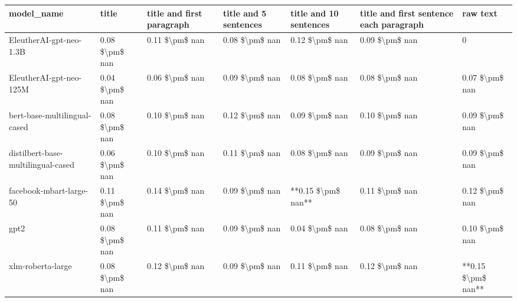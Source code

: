 \begin{tabular}{lllllll}
\toprule
                        model\_name &          title & title and first paragraph & title and 5 sentences & title and 10 sentences & title and first sentence each paragraph &           raw text \\
\midrule
           EleutherAI-gpt-neo-1.3B & 0.08 \$\textbackslash pm\$ nan &            0.11 \$\textbackslash pm\$ nan &        0.08 \$\textbackslash pm\$ nan &         0.12 \$\textbackslash pm\$ nan &                          0.09 \$\textbackslash pm\$ nan &                  0 \\
           EleutherAI-gpt-neo-125M & 0.04 \$\textbackslash pm\$ nan &            0.06 \$\textbackslash pm\$ nan &        0.09 \$\textbackslash pm\$ nan &         0.08 \$\textbackslash pm\$ nan &                          0.08 \$\textbackslash pm\$ nan &     0.07 \$\textbackslash pm\$ nan \\
      bert-base-multilingual-cased & 0.08 \$\textbackslash pm\$ nan &            0.10 \$\textbackslash pm\$ nan &        0.12 \$\textbackslash pm\$ nan &         0.09 \$\textbackslash pm\$ nan &                          0.10 \$\textbackslash pm\$ nan &     0.09 \$\textbackslash pm\$ nan \\
distilbert-base-multilingual-cased & 0.06 \$\textbackslash pm\$ nan &            0.10 \$\textbackslash pm\$ nan &        0.11 \$\textbackslash pm\$ nan &         0.08 \$\textbackslash pm\$ nan &                          0.09 \$\textbackslash pm\$ nan &     0.09 \$\textbackslash pm\$ nan \\
           facebook-mbart-large-50 & 0.11 \$\textbackslash pm\$ nan &            0.14 \$\textbackslash pm\$ nan &        0.09 \$\textbackslash pm\$ nan &     **0.15 \$\textbackslash pm\$ nan** &                          0.11 \$\textbackslash pm\$ nan &     0.12 \$\textbackslash pm\$ nan \\
                              gpt2 & 0.08 \$\textbackslash pm\$ nan &            0.11 \$\textbackslash pm\$ nan &        0.09 \$\textbackslash pm\$ nan &         0.04 \$\textbackslash pm\$ nan &                          0.08 \$\textbackslash pm\$ nan &     0.10 \$\textbackslash pm\$ nan \\
                 xlm-roberta-large & 0.08 \$\textbackslash pm\$ nan &            0.12 \$\textbackslash pm\$ nan &        0.09 \$\textbackslash pm\$ nan &         0.11 \$\textbackslash pm\$ nan &                          0.12 \$\textbackslash pm\$ nan & **0.15 \$\textbackslash pm\$ nan** \\
\bottomrule
\end{tabular}
